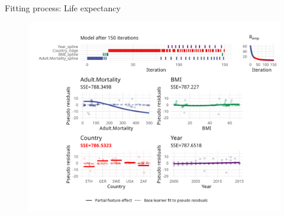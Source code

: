 \begin{frame}{Fitting process: Life expectancy}
	\begin{figure}
		\centering
		\includegraphics[width=\textwidth]{figures/cwb-anim/fig-iter-0150.png}
	\end{figure}
	\addtocounter{framenumber}{-1}
\end{frame}

